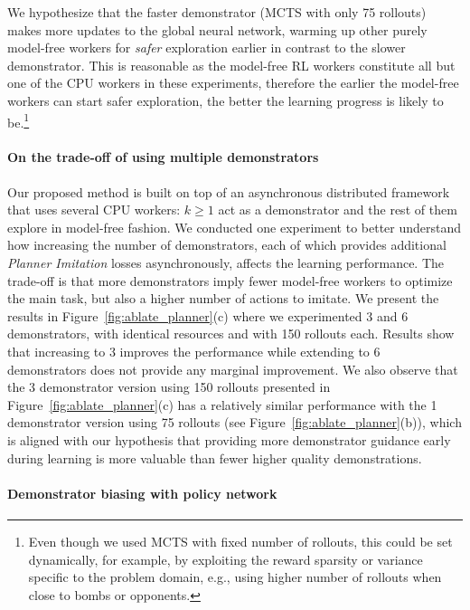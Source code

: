 \documentclass[letterpaper]{article}
\begin{document}
We hypothesize that the faster demonstrator (MCTS with only 75 rollouts) makes more updates to the global neural network, warming up other purely model-free workers for \emph{safer} exploration earlier in contrast to the slower demonstrator. This is reasonable as the model-free RL workers constitute all but one of the CPU workers in these experiments, therefore the earlier the model-free workers can start safer exploration, the better the learning progress is likely to be.\footnote{Even though we used MCTS with fixed number of rollouts, this could be set dynamically, for example, by exploiting the reward sparsity or variance specific to the problem domain, e.g., using higher number of rollouts when close to bombs or opponents.}

\paragraph{On the trade-off of using multiple demonstrators}

Our proposed method is built on top of an asynchronous distributed framework that uses several CPU workers: $k\ge 1$ act as a demonstrator and the rest of them explore in model-free fashion. We conducted one  experiment to better understand how increasing the number of demonstrators, each of which provides additional \emph{Planner Imitation} losses asynchronously, affects the learning performance. The trade-off is that more demonstrators imply fewer model-free workers to optimize the main task, but also a higher number of actions to imitate. We present the results in Figure~\ref{fig:ablate_planner}(c) where we experimented 3 and 6 demonstrators, with identical resources and with 150 rollouts each. Results show that increasing to 3 improves the performance while extending to 6 demonstrators does not provide any marginal improvement. We also observe that the 3 demonstrator version using 150 rollouts presented in Figure~\ref{fig:ablate_planner}(c) has a relatively similar performance with the 1 demonstrator version using 75 rollouts (see Figure~\ref{fig:ablate_planner}(b)), which is aligned with our hypothesis that providing more demonstrator guidance early during learning is more valuable than fewer higher quality demonstrations.
\paragraph{Demonstrator biasing with policy network}
\end{document}
